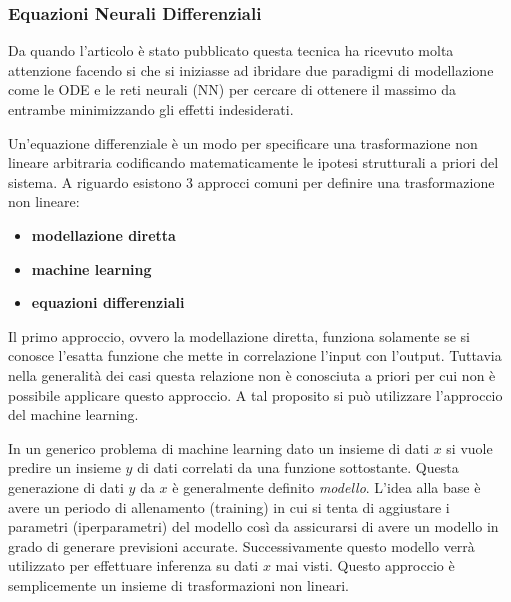 \subsubsection*{Equazioni Neurali Differenziali}
Da quando l'articolo \cite{chen2019neural} è stato pubblicato questa tecnica
ha ricevuto molta attenzione facendo si che si iniziasse ad ibridare due paradigmi di modellazione come
le ODE e le reti neurali (NN)  per cercare di ottenere il massimo da entrambe minimizzando 
gli effetti indesiderati. \cite{Kim_2021} \cite{chen2019neural}

Un'equazione differenziale è un modo per specificare una trasformazione 
non lineare arbitraria codificando matematicamente le ipotesi strutturali 
a priori del sistema. A riguardo esistono 3 approcci comuni per definire una 
trasformazione non lineare:

\begin{itemize}
    \item \textbf{modellazione diretta}
    \item \textbf{machine learning}
    \item \textbf{equazioni differenziali}
\end{itemize}

Il primo approccio, ovvero la modellazione diretta, funziona solamente se si 
conosce l'esatta funzione che mette in correlazione l'input con l'output. 
Tuttavia nella generalità dei casi questa relazione non è conosciuta a 
priori per cui non è possibile applicare questo approccio. A tal proposito
si può utilizzare l'approccio del machine learning. 

In un generico problema di machine learning dato un insieme di dati $x$ si 
vuole predire un insieme $y$ di dati correlati da una funzione sottostante.
Questa generazione di dati $y$ da $x$ è generalmente definito \emph{modello}. 
L'idea alla base è avere un periodo di allenamento (training) in cui si tenta 
di aggiustare i parametri (iperparametri) del modello così da assicurarsi di 
avere un modello in grado di generare previsioni accurate. Successivamente 
questo modello verrà utilizzato per effettuare inferenza su dati $x$ mai visti. 
Questo approccio è semplicemente un insieme di trasformazioni non lineari. 

